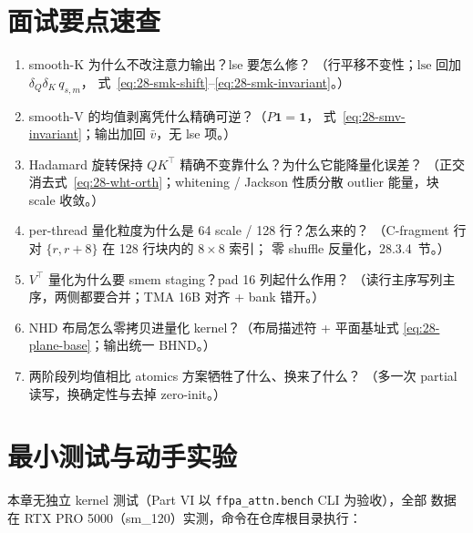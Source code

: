 \section{面试要点速查}

\begin{enumerate}[itemsep=1pt,topsep=2pt]
  \item smooth-K 为什么不改注意力输出？lse 要怎么修？
        （行平移不变性；$\mathrm{lse}$ 回加 $\delta_Q\delta_K\, q_{s,m}$，
        式~\ref{eq:28-smk-shift}--\ref{eq:28-smk-invariant}。）
  \item smooth-V 的均值剥离凭什么精确可逆？（$P\mathbf{1}=\mathbf{1}$，
        式~\ref{eq:28-smv-invariant}；输出加回 $\bar v$，无 lse 项。）
  \item Hadamard 旋转保持 $QK^{\top}$ 精确不变靠什么？为什么它能降量化误差？
        （正交消去式~\ref{eq:28-wht-orth}；whitening / Jackson 性质分散 outlier
        能量，块 scale 收敛。）
  \item per-thread 量化粒度为什么是 64 scale / 128 行？怎么来的？
        （C-fragment 行对 $\{r,r+8\}$ 在 128 行块内的 $8\times8$ 索引；
        零 shuffle 反量化，28.3.4~节。）
  \item $V^{\top}$ 量化为什么要 smem staging？pad 16 列起什么作用？
        （读行主序写列主序，两侧都要合并；TMA 16B 对齐 + bank 错开。）
  \item NHD 布局怎么零拷贝进量化 kernel？（布局描述符 + 平面基址式
        \ref{eq:28-plane-base}；输出统一 BHND。）
  \item 两阶段列均值相比 atomics 方案牺牲了什么、换来了什么？
        （多一次 partial 读写，换确定性与去掉 zero-init。）
\end{enumerate}

\section{最小测试与动手实验}

本章无独立 kernel 测试（Part VI 以 \texttt{ffpa\_attn.bench} CLI 为验收），全部
数据在 RTX PRO 5000（sm\_120）实测，命令在仓库根目录执行：

